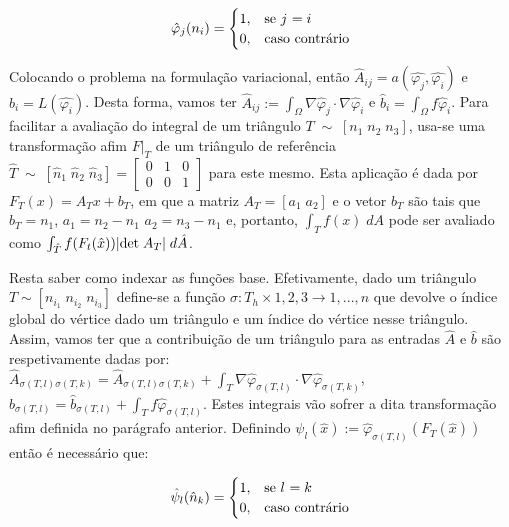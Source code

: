 \documentclass{article}
\theoremstyle{definition}
\theoremstyle{plain}
\numberwithin{equation}{section}
\newcommand{\tab}{\hspace{10mm}}
\begin{document}
\begin{equation*}
     \hat{\varphi}_j(n_i) = \begin{cases} $$1$$, & \mbox{se } j\mbox{ $=i$} \\ 0, & \mbox{caso contrário}
     \end{cases}
\end{equation*}

Colocando o problema na formulação variacional, então $\hat{A}_{ij}=a(\hat{\varphi_j},\hat{\varphi_i})$ e $\hat{b}_i=L(\hat{\varphi_i})$. Desta forma, vamos ter $\hat{A}_{ij}:=\int_\Omega{\nabla \hat{\varphi}_j \cdot \nabla \hat{\varphi}_i}$ e $\hat{b}_i=\int_\Omega{f\hat{\varphi}_i}$. Para facilitar a avaliação do integral de um triângulo $T \; \sim \; [n_1 \; n_2 \; n_3]$, usa-se uma transformação afim $F\vert_T$ de um triângulo de referência $\hat{T} \; \sim \; [\hat{n}_1 \; \hat{n}_2 \; \hat{n}_3] = \begin{bmatrix} 0 & 1 & 0  \\  0 & 0 & 1\end{bmatrix}$ para este mesmo. Esta aplicação é dada por $F_{T}(x)=A_Tx+b_T$, em que a matriz $A_T = [a_1 \; a_2]$ e o vetor $b_T$ são tais que $b_T = n_1$, $a_1=n_2-n_1$ $a_2=n_3-n_1$ e, portanto, $\int_T{f(x) \; dA}$ pode ser avaliado como $\int_{\hat{T}}{f(F_t(\hat{x})) \abs{\textrm{det} \; A_T} \; d\hat{A}}$.

\vspace{5mm}
\tab Resta saber como indexar as funções base. Efetivamente, dado um triângulo $T  \sim  [n_{i_1} \; n_{i_2} \; n_{i_3}] $ define-se a função $\sigma :  T_h \times {1,2,3} \to {1,...,\hat{n}}$ que devolve o índice global do vértice dado um triângulo e um índice do vértice nesse triângulo. Assim, vamos ter que a contribuição de um triângulo para as entradas $\hat{A}$ e $\hat{b}$ são respetivamente dadas por: $\hat{A}_{\sigma(T,l)\sigma(T,k)}=\hat{A}_{\sigma(T,l)\sigma(T,k)} + \int_T{\nabla \hat{\varphi}_{\sigma(T,l)} \cdot \nabla \hat{\varphi}_{\sigma(T,k)}}$, $\hat{b}_{\sigma(T,l)}=\hat{b}_{\sigma(T,l)} + \int_T{f\hat{\varphi}_{\sigma(T,l)}}$. Estes integrais vão sofrer a dita transformação afim definida no parágrafo anterior. Definindo $\psi_l(\hat{x}):=\hat{\varphi}_{\sigma(T,l)}(F_T(\hat{x}))$ então é necessário que:

\begin{equation*}
     \hat{\psi}_l(\hat{n}_k) = \begin{cases} $$1$$, & \mbox{se } l\mbox{ $=k$} \\ 0, & \mbox{caso contrário}
     \end{cases}
\end{equation*}
\end{document}
